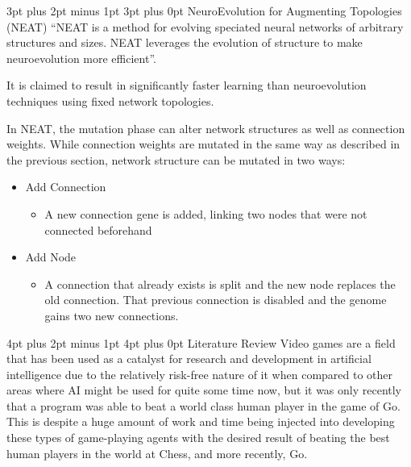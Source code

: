 \documentclass[12pt,a4paper]{article}
\makeatletter
\renewcommand\subsection{\@startsection {subsection}{1}{2mm} %
                               {3pt plus 2pt minus 1pt} %
                               {3pt plus 0pt} %
                               {\normalfont\bfseries}}
\renewcommand\section{\@startsection {section}{1}{0mm} %
                               {4pt plus 2pt minus 1pt} %
                               {4pt plus 0pt} %
                               {\bfseries}}
\makeatother
\begin{document}
\newpage
\subsection{NeuroEvolution for Augmenting Topologies (NEAT)}
\enquote{NEAT is a method for evolving speciated neural networks of arbitrary structures and sizes. NEAT leverages the evolution of structure to make neuroevolution more efficient}\citep{NEAT}.

It is claimed to result in significantly faster learning than neuroevolution techniques using fixed network topologies.
 
 In NEAT, the mutation phase can alter network structures as well as connection weights\citep{EfficientEvolutionOfNeuralNetworkTopologies}. While connection weights are mutated in the same way as described in the previous section, network structure can be mutated in two ways:
 
 \begin{itemize}
 	\item Add Connection
 	\begin{itemize}
 		\item A new connection gene is added, linking two nodes that were not connected beforehand
 	\end{itemize}
 	\item Add Node
 	\begin{itemize}
 		\item A connection that already exists is split and the new node replaces the old connection. That previous connection is disabled and the genome gains two new connections. 
 	\end{itemize}
 \end{itemize}
 
 

\newpage
\section{Literature Review}
Video games are a field that has been used as a catalyst for research and development in artificial intelligence due to the relatively risk-free nature of it when compared to other areas where AI might be used for quite some time now, but it was only recently that a program was able to beat a world class human player in the game of Go\citep{ABriefHistoryOfGameAI}. This is despite a huge amount of work and time being injected into developing these types of game-playing agents with the desired result of beating the best human players in the world at Chess, and more recently, Go. 
\end{document}
